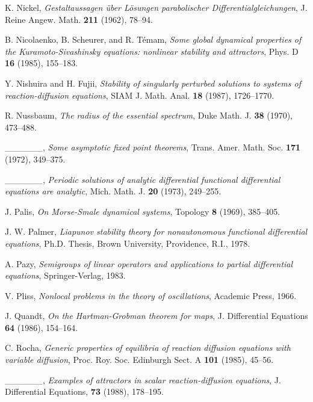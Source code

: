 \documentclass{surv-l}
\theoremstyle{plain}
\theoremstyle{definition}
\numberwithin{equation}{section}
\numberwithin{figure}{chapter}
\begin{document}
\begin{thebibliography}{}
K. Nickel, \emph{Gestaltaussagen \"{u}ber L\"{o}sungen parabolischer Differentialgleichungen}, J. Reine Angew. Math. \textbf{211} (1962), 78--94.

B. Nicolaenko, B. Scheurer, and R. T\'{e}mam, \emph{Some global dynamical properties of the Kuramoto-Sivashinsky equations: nonlinear stability and attractors}, Phys. D \textbf{16} (1985), 155--183.

Y. Nishuira and H. Fujii, \emph{Stability of singularly perturbed solutions to systems of reaction-diffusion equations}, SIAM J. Math. Anal. \textbf{18} (1987), 1726--1770.

R. Nussbaum, \emph{The radius of the essential spectrum}, Duke Math. J. \textbf{38} (1970), 473--488.

 \_\_\_\_\_\_, \emph{Some asymptotic fixed point theorems}, Trans. Amer. Math. Soc. \textbf{171} (1972), 349--375.

 \_\_\_\_\_\_, \emph{Periodic solutions of analytic differential functional differential equations are analytic}, Mich. Math. J. \textbf{20} (1973), 249--255.

J. Palis, \emph{On Morse-Smale dynamical systems}, Topology \textbf{8} (1969), 385--405.

J. W. Palmer, \emph{Liapunov stability theory for nonautonomous functional differential equations}, Ph.D. Thesis, Brown University, Providence, R.I., 1978.

A. Pazy, \emph{Semigroups of linear operators and applications to partial differential equations}, Springer-Verlag, 1983.

V. Pliss, \emph{Nonlocal problems in the theory of oscillations}, Academic Press, 1966.

J. Quandt, \emph{On the Hartman-Grobman theorem for maps}, J. Differential Equations \textbf{64} (1986), 154--164.

C. Rocha, \emph{Generic properties of equilibria of reaction diffusion equations with variable diffusion}, Proc. Roy. Soc. Edinburgh Sect. A \textbf{101} (1985), 45--56.

 \_\_\_\_\_\_, \emph{Examples of attractors in scalar reaction-diffusion equations}, J. Differential Equations, \textbf{73} (1988), 178--195.


\end{thebibliography}
\end{document}
